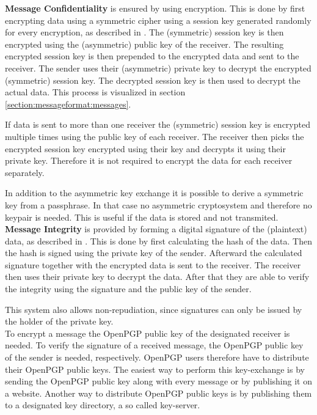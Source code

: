 \textbf{Message Confidentiality} is ensured by using encryption. This is done by first encrypting data using a symmetric cipher using a session key generated randomly for every encryption, as described in \cite[section 2.1]{RFC4880}. The (symmetric) session key is then encrypted using the (asymmetric) public key of the receiver. The resulting encrypted session key is then prepended to the encrypted data and sent to the receiver. The sender uses their (asymmetric) private key to decrypt the encrypted (symmetric) session key. The decrypted session key is then used to decrypt the actual data. This process is visualized in section \ref{section:messageformat:messages}. %

If data is sent to more than one receiver the (symmetric) session key is encrypted multiple times using the public key of each receiver. The receiver then picks the encrypted session key encrypted using their key and decrypts it using their private key. Therefore it is not required to encrypt the data for each receiver separately.

In addition to the asymmetric key exchange it is possible to derive a symmetric key from a passphrase. In that case no asymmetric cryptosystem and therefore no keypair is needed. This is useful if the data is stored and not transmited.\\

\textbf{Message Integrity} is provided by forming a digital signature of the (plaintext) data, as described in \cite[section 2.2]{RFC4880}. This is done by first calculating the hash of the data. Then the hash is signed using the private key of the sender. Afterward the calculated signature together with the encrypted data is sent to the receiver. The receiver then uses their private key to decrypt the data. After that they are able to verify the integrity using the signature and the public key of the sender.

This system also allows non-repudiation, since signatures can only be issued by the holder of the private key.\\


To encrypt a message the OpenPGP public key of the designated receiver is needed. To verify the signature of a received message, the OpenPGP public key of the sender is needed, respectively. OpenPGP users therefore have to distribute their OpenPGP public keys. The easiest way to perform this key-exchange is by sending the OpenPGP public key along with every message or by publishing it on a website. Another way to distribute OpenPGP public keys is by publishing them to a designated key directory, a so called key-server.


